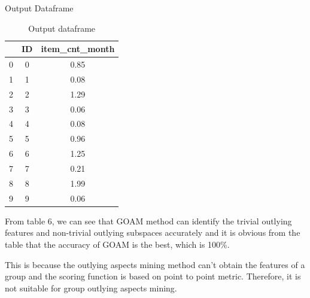 \documentclass[
 size=14pt,
 paper=smartboard,  %
 mode=present, 		%
 display=slides, 	%
 style=tuliplab,  	%
 pauseslide,
 fleqn,leqno]{powerdot}
\begin{document}
\begin{slide}[toc=,bm=]{Output Dataframe}

  \begin{table}[tb]
  \setlength{\abovecaptionskip}{0pt}
  \setlength{\belowcaptionskip}{10pt}
  \centering
  \caption{Output dataframe}
  
  \begin{tabular}{ c | c | c }
  \toprule
    &  ID    & item_cnt_month      \\
    \midrule
    0 &  0  &  0.85     \\
    
    1 &  1   &  0.08 \\
    
    2 &   2   &  1.29 \\
    3 &   3  &  0.06 \\
    4 &   4   &  0.08 \\
    5 &  5   &  0.96 \\
    6 &  6  &  1.25 \\
    7 &  7   &  0.21 \\
    8 &  8   &  1.99 \\
    9 &  9   &  0.06 \\
  \bottomrule
  \end{tabular}
  \end{table}
  
  \begin{note}
  From table $6$,
  we can see that GOAM method can identify the trivial outlying features
  and non-trivial outlying subspaces accurately and
  it is obvious from the table that the accuracy of GOAM is the best,
  which is 100\%.
  
  This is because the outlying aspects mining method
  can't obtain the features of a group and the scoring function
  is based on point to point metric.
  Therefore,
  it is not suitable for group outlying aspects mining.
  \end{note}
  
  \end{slide}   

\end{document}
